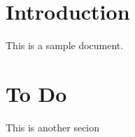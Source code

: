 \documentclass{../lib/lib-en}
\begin{document}

\newpage


\section{Introduction}
This is a sample document.
\section{To Do}
This is another secion


% 

\newpage

\end{document}
